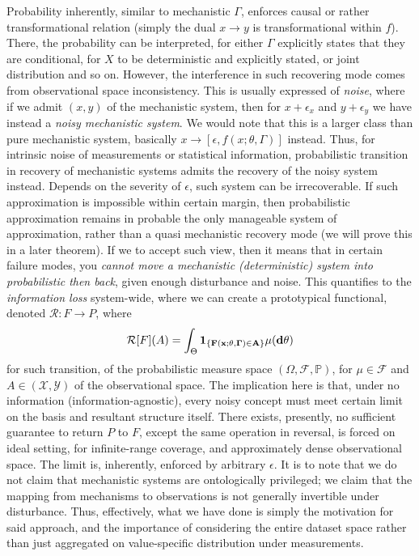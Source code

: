 Probability inherently, similar to mechanistic $\Gamma$, enforces causal or rather transformational relation (simply the dual $x\to y$ is transformational within $f$). There, the probability can be interpreted, for either $\Gamma$ explicitly states that they are conditional, for $X$ to be deterministic and explicitly stated, or joint distribution and so on. However, the interference in such recovering mode comes from observational space inconsistency. This is usually expressed of \textit{noise}, where if we admit $(x,y)$ of the mechanistic system, then for $x+\epsilon_{x}$ and $y+\epsilon_{y}$ we have instead a \textit{noisy mechanistic system}. We would note that this is a larger class than pure mechanistic system, basically $x\to [\epsilon, f(x;\theta,\Gamma)]$ instead. Thus, for intrinsic noise of measurements or statistical information, probabilistic transition in recovery of mechanistic systems admits the recovery of the noisy system instead. Depends on the severity of $\epsilon$, such system can be irrecoverable. If such approximation is impossible within certain margin, then probabilistic approximation remains in probable the only manageable system of approximation, rather than a quasi mechanistic recovery mode (we will prove this in a later theorem). If we to accept such view, then it means that in certain failure modes, you \textit{cannot move a mechanistic (deterministic) system into probabilistic then back}, given enough disturbance and noise. This quantifies to the \textit{information loss} system-wide, where we can create a prototypical functional, denoted $\mathcal{R}:F\to P$, where
\begin{equation}
    \mathcal{R}[F](A) = \int_{\Theta} \bf{1}_{\{F(x;\theta,\Gamma)\in A\}}\mu (d\theta)
\end{equation}
for such transition, of the probabilistic measure space $(\Omega, \mathcal{F},\mathbb{P})$, for $\mu\in \mathcal{F}$ and $A\in(\mathcal{X},\mathcal{Y})$ of the observational space. The implication here is that, under no information (information-agnostic), every noisy concept must meet certain limit on the basis and resultant structure itself. There exists, presently, no sufficient guarantee to return $P$ to $F$, except the same operation in reversal, is forced on ideal setting, for infinite-range coverage, and approximately dense observational space. The limit is, inherently, enforced by arbitrary $\epsilon$. It is to note that we do not claim that mechanistic systems are ontologically privileged; we claim that the mapping from mechanisms to observations is not generally invertible under disturbance. Thus, effectively, what we have done is simply the motivation for said approach, and the importance of considering the entire dataset space rather than just aggregated on value-specific distribution under measurements. 
